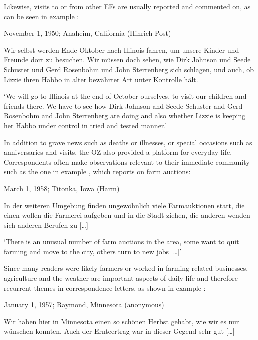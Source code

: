 \documentclass[output=paper]{langsci/langscibook}
\begin{document}
Likewise, visits to or from other EFs are usually reported and commented on, as can be seen in example :

 
\ea
\label{ex:rocker:7} 
November 1, 1950; Anaheim, California (Hinrich Post)\smallskip\\\relax 

Wir selbst werden Ende Oktober nach Illinois fahren, um unsere Kinder und Freunde dort zu besuchen. Wir müssen doch sehen, wie Dirk Johnson und Seede Schuster und Gerd Rosenbohm und John Sterrenberg sich schlagen, und auch, ob Lizzie ihren Habbo in alter bewährter Art unter Kontrolle hält.\smallskip\\\relax 

‘We will go to Illinois at the end of October ourselves, to visit our children and friends there. We have to see how Dirk Johnson and Seede Schuster and Gerd Rosenbohm and John Sterrenberg are doing and also whether Lizzie is keeping her Habbo under control in tried and tested manner.’ 
\z

In addition to grave news such as deaths or illnesses, or special occasions such as anniversaries and visits, the OZ also provided a platform for everyday life. Correspondents often make observations relevant to their immediate community such as the one in example , which reports on farm auctions: 

 
\ea
\label{ex:rocker:8}
March 1, 1958; Titonka, Iowa (Harm)\smallskip\\\relax 

In der weiteren Umgebung finden ungewöhnlich viele Farmauktionen statt, die einen wollen die Farmerei aufgeben und in die Stadt ziehen, die anderen wenden sich anderen Berufen zu […]\smallskip\\\relax 

‘There is an unusual number of farm auctions in the area, some want to quit farming and move to the city, others turn to new jobs […]’
\z

Since many readers were likely farmers or worked in farming-related businesses, agriculture and the weather are important aspects of daily life and therefore recurrent themes in correspondence letters, as shown in example :

 
\ea
\label{ex:rocker:9}
January 1, 1957; Raymond, Minnesota (anonymous)\smallskip\\\relax 

Wir haben hier in Minnesota einen so schönen Herbst gehabt, wie wir es nur wünschen konnten. Auch der Ernteertrag war in dieser Gegend sehr gut […]\smallskip\\\relax 
\end{document}
